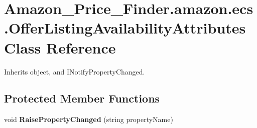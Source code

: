 \hypertarget{class_amazon___price___finder_1_1amazon_1_1ecs_1_1_offer_listing_availability_attributes}{\section{Amazon\-\_\-\-Price\-\_\-\-Finder.\-amazon.\-ecs.\-Offer\-Listing\-Availability\-Attributes Class Reference}
\label{class_amazon___price___finder_1_1amazon_1_1ecs_1_1_offer_listing_availability_attributes}
}


 




Inherits object, and I\-Notify\-Property\-Changed.

\subsection*{Protected Member Functions}
\begin{DoxyCompactItemize}
\item 
\hypertarget{class_amazon___price___finder_1_1amazon_1_1ecs_1_1_offer_listing_availability_attributes_a1f3a32bbbe9711ade082d63cc665925c}{void {\bfseries Raise\-Property\-Changed} (string property\-Name)}\label{class_amazon___price___finder_1_1amazon_1_1ecs_1_1_offer_listing_availability_attributes_a1f3a32bbbe9711ade082d63cc665925c}

\end{DoxyCompactItemize}
